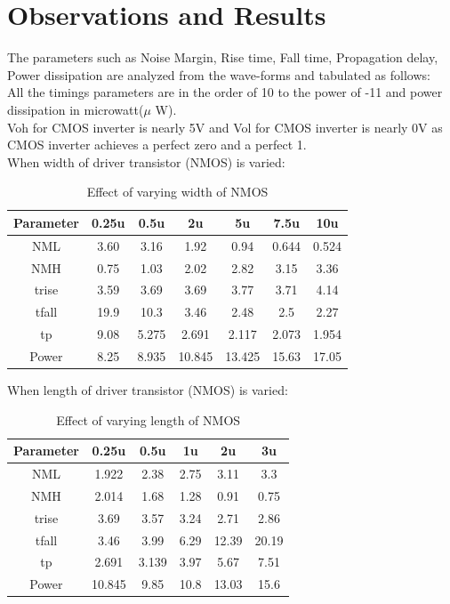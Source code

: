\documentclass[12pt,a4paper]{article}
\begin{document}
\section{Observations and Results}

The parameters such as Noise Margin, Rise time, Fall time, Propagation delay, Power dissipation are analyzed from the wave-forms and tabulated as follows:\\

All the timings parameters are in the order of 10 to the power of -11 and power dissipation in microwatt($\mu$ W).\\

Voh for CMOS inverter is nearly 5V and Vol for CMOS inverter is nearly 0V as CMOS inverter achieves a perfect zero and a perfect 1.\\

When width of driver transistor (NMOS) is varied:
\begin{table}[H]
\centering
\begin{tabular}{||c c c c c c c||} 
 \hline
 Parameter & 0.25u & 0.5u & 2u & 5u & 7.5u & 10u\\ [0.5ex] 
 \hline\hline
 NML & 3.60 & 3.16 & 1.92 & 0.94 & 0.644 & 0.524\\ 
 NMH & 0.75 & 1.03 & 2.02 & 2.82 & 3.15 & 3.36\\
 trise & 3.59 & 3.69 & 3.69 & 3.77 & 3.71 & 4.14\\
 tfall & 19.9 & 10.3 & 3.46 & 2.48 & 2.5 & 2.27\\
 tp & 9.08 & 5.275 & 2.691 & 2.117 & 2.073 & 1.954\\
 Power & 8.25 & 8.935 & 10.845 & 13.425 & 15.63 & 17.05 \\
 [0.5ex] 
 \hline
\end{tabular}
\caption{Effect of varying width of NMOS}
\label{table:1}
\end{table}

When length of driver transistor (NMOS) is varied:
\begin{table}[H]
\centering
\begin{tabular}{||c c c c c c||} 
 \hline
 Parameter & 0.25u & 0.5u & 1u & 2u & 3u \\ [0.5ex] 
 \hline\hline
 NML & 1.922 & 2.38 & 2.75 & 3.11 & 3.3\\ 
 NMH & 2.014 & 1.68 & 1.28 & 0.91 & 0.75\\
 trise & 3.69 & 3.57 & 3.24 & 2.71 & 2.86\\
 tfall & 3.46 & 3.99 & 6.29 & 12.39 & 20.19\\
 tp & 2.691 & 3.139 & 3.97 & 5.67 & 7.51\\
 Power & 10.845 & 9.85 & 10.8 & 13.03 & 15.6\\
 [0.5ex] 
 \hline
\end{tabular}
\caption{Effect of varying length of NMOS}
\label{table:1}
\end{table}
\end{document}
